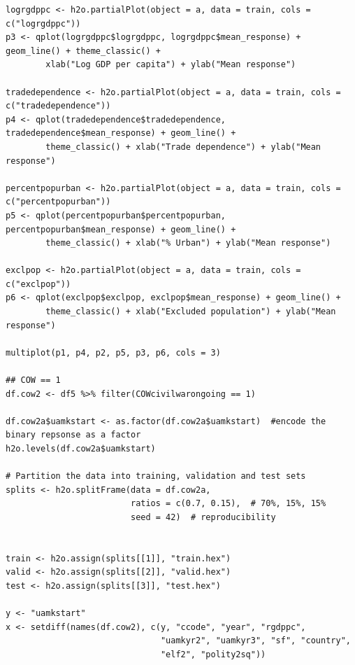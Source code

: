 \begin{verbatim}
logrgdppc <- h2o.partialPlot(object = a, data = train, cols = c("logrgdppc"))
p3 <- qplot(logrgdppc$logrgdppc, logrgdppc$mean_response) + geom_line() + theme_classic() +
        xlab("Log GDP per capita") + ylab("Mean response")

tradedependence <- h2o.partialPlot(object = a, data = train, cols = c("tradedependence"))
p4 <- qplot(tradedependence$tradedependence, tradedependence$mean_response) + geom_line() +
        theme_classic() + xlab("Trade dependence") + ylab("Mean response")

percentpopurban <- h2o.partialPlot(object = a, data = train, cols = c("percentpopurban"))
p5 <- qplot(percentpopurban$percentpopurban, percentpopurban$mean_response) + geom_line() +
        theme_classic() + xlab("% Urban") + ylab("Mean response")
        
exclpop <- h2o.partialPlot(object = a, data = train, cols = c("exclpop"))
p6 <- qplot(exclpop$exclpop, exclpop$mean_response) + geom_line() +
        theme_classic() + xlab("Excluded population") + ylab("Mean response")

multiplot(p1, p4, p2, p5, p3, p6, cols = 3)

## COW == 1
df.cow2 <- df5 %>% filter(COWcivilwarongoing == 1)

df.cow2a$uamkstart <- as.factor(df.cow2a$uamkstart)  #encode the binary repsonse as a factor
h2o.levels(df.cow2a$uamkstart)

# Partition the data into training, validation and test sets
splits <- h2o.splitFrame(data = df.cow2a, 
                         ratios = c(0.7, 0.15),  # 70%, 15%, 15%
                         seed = 42)  # reproducibility


train <- h2o.assign(splits[[1]], "train.hex")   
valid <- h2o.assign(splits[[2]], "valid.hex") 
test <- h2o.assign(splits[[3]], "test.hex")

y <- "uamkstart"
x <- setdiff(names(df.cow2), c(y, "ccode", "year", "rgdppc",
                               "uamkyr2", "uamkyr3", "sf", "country",
                               "elf2", "polity2sq")) 


\end{verbatim}
